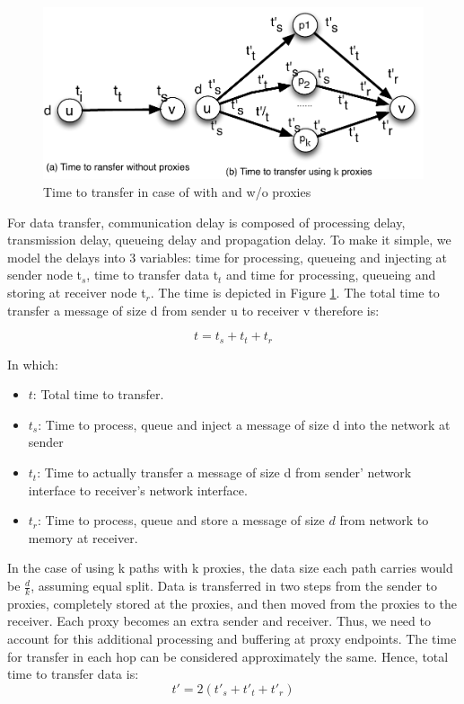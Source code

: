 \begin{figure}[!htb]
\vspace{-0.1in}
\centering
\includegraphics[scale=0.5]{figures/transfer_time.pdf}
\vspace{-0.2in}
\caption{Time to transfer in case of with and w/o proxies}
\vspace{-0.1in}
\label{fig:proxies}
\end{figure}
For data transfer, communication delay is composed of processing delay, transmission delay, queueing delay and propagation delay. To make it simple, we model the delays into 3 variables: time for processing, queueing and injecting at sender node t$_s$, time to transfer data t$_t$ and time for processing, queueing and storing at receiver node t$_r$. The time is depicted in Figure \ref{fig:proxies}. The total time to transfer a message of size d from sender u to receiver v therefore is:

\begin{equation}
t = t_s + t_t + t_r
\end{equation}

In which:
\begin{itemize}
\item $t$: Total time to transfer.
\item $t_s$: Time to process, queue and inject a message of size d into the network at sender
\item $t_t$: Time to actually transfer a message of size d from sender' network interface to receiver's network interface.
\item $t_r$: Time to process, queue and store a message of size $d$ from network to memory at receiver.
\end{itemize}

In the case of using k paths with k proxies, the data size each path carries would be $\frac{d}{k}$, assuming equal split. Data is transferred in two steps from the sender to proxies, completely stored at the proxies, and then moved from the proxies to the receiver. Each proxy becomes an extra sender and receiver. Thus, we need to account for this additional processing and buffering at proxy endpoints. The time for transfer in each hop can be considered approximately the same. Hence, total time to transfer data is:
\begin{equation}
t' = 2(t'_s + t'_t + t'_r) %
\end{equation}

